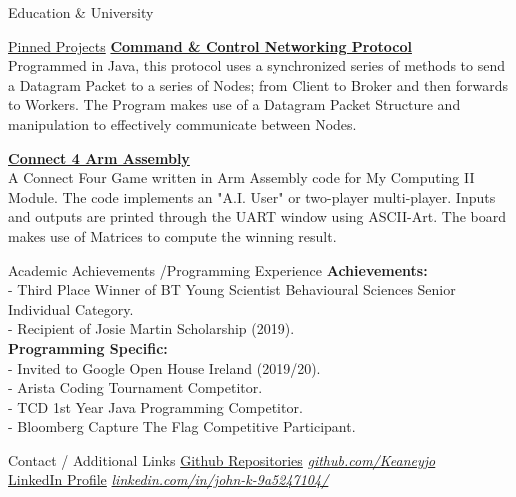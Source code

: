 \documentclass{resume} %
\begin{document}
\begin{rSection}{Education \& University}
\begin{rSection}{\href{https://github.com/Keaneyjo}{Pinned Projects}}
\href{https://github.com/Keaneyjo/Command-Control-Networking-Protocol}{{\bf Command \& Control Networking Protocol}}\\
Programmed in Java, this protocol uses a synchronized series of methods to send a Datagram Packet to a series of Nodes; from Client to Broker and then forwards to Workers. The Program makes use of a Datagram Packet Structure and manipulation to effectively communicate between Nodes.

\href{https://github.com/Keaneyjo/Connect-4-Arm-Assembly}{{\bf Connect 4 Arm Assembly}}\\
A Connect Four Game written in Arm Assembly code for My Computing II Module. The code implements an "A.I. User" or two-player multi-player. Inputs and outputs are printed through the UART window using ASCII-Art. The board makes use of Matrices to compute the winning result.

\end{rSection}
\end{rSection}

\begin{rSection}{Academic Achievements /Programming Experience}
{\bf Achievements:}\\
- Third Place Winner of BT Young Scientist Behavioural Sciences Senior Individual Category.\\
- Recipient of Josie Martin Scholarship (2019).\\
{\bf Programming Specific:}\\
- Invited to Google Open House Ireland (2019/20).\\
- Arista Coding Tournament Competitor.\\
- TCD 1st Year Java Programming Competitor.\\
- Bloomberg Capture The Flag Competitive Participant.

%
%

\end{rSection}



\begin{rSection}{Contact / Additional Links} 
\href{https://github.com/Keaneyjo}{Github Repositories} 
\hfill {\href{https://github.com/Keaneyjo}{\em github.com/Keaneyjo}}\\
\href{https://www.linkedin.com/in/john-k-9a5247104/}{LinkedIn Profile}  
\hfill {\href{https://www.linkedin.com/in/john-k-9a5247104/}{\em linkedin.com/in/john-k-9a5247104/}} \\
\end{rSection}
\end{document}
